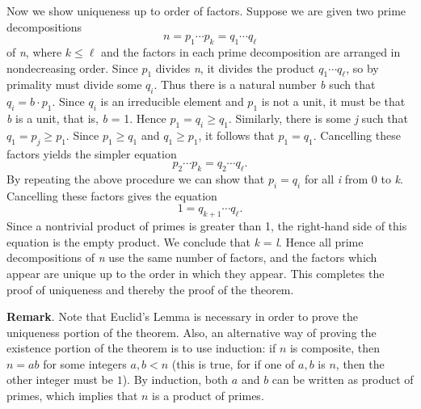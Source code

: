 \documentclass{article}
\newcommand{\fm}[1]{{\it #1}}
\begin{document}
\begin{description}
Now we show uniqueness up to order of factors.  Suppose we are given
two prime decompositions
\[
  n = p_1 \cdots p_k = q_1 \cdots q_{\ell}
\]
of \fm{n}, where $k\le\ell$ and the factors in each prime decomposition
are arranged in nondecreasing order.  Since $p_1$ divides \fm{n}, it
divides the product $q_1 \cdots q_{\ell}$, so by primality must divide
some $q_i$.  Thus there is a natural number \fm{b} such that $q_i =
b\cdot p_1$.  Since $q_i$ is an irreducible element and $p_1$ is not a
unit, it must be that \fm{b} is a unit, that is, \fm{b} = 1.  Hence
$p_1 = q_i \ge q_1$.  Similarly, there is some \fm{j} such that $q_1 =
p_j \ge p_1$.  Since $p_1 \ge q_1$ and $q_1 \ge p_1$, it follows that
$p_1 = q_1$.  Cancelling these factors yields the simpler equation
\[
  p_2 \cdots p_k = q_2 \cdots q_{\ell}.
\]
By repeating the above procedure we can show that $p_i = q_i$ for all
\fm{i} from 0 to \fm{k}.  Cancelling these factors gives the equation
\[
  1 = q_{k+1} \cdots q_{\ell}.
\]
Since a nontrivial product of primes is greater than 1, the right-hand
side of this equation is the empty product.  We conclude that \fm{k} =
\fm{l}.  Hence all prime decompositions of \fm{n} use the same number
of factors, and the factors which appear are unique up to the order in
which they appear.  This completes the proof of uniqueness and thereby
the proof of the theorem.

\end{description}

\textbf{Remark}.  Note that Euclid's Lemma is necessary in order to prove the uniqueness portion of the theorem.  Also, an alternative way of proving the existence portion of the theorem is to use induction: if $n$ is composite, then $n=ab$ for some integers $a,b<n$ (this is true, for if one of $a,b$ is $n$, then the other integer must be $1$).  By induction, both $a$ and $b$ can be written as product of primes, which implies that $n$ is a product of primes.

\end{document}
